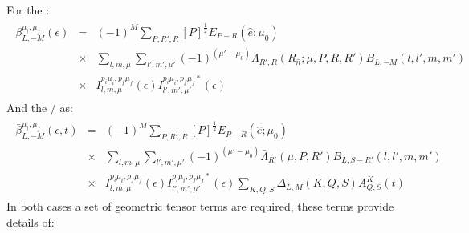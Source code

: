 \documentclass[letterpaper,table,10pt,english]{jupyterBook}
\begin{document}
\sphinxAtStartPar
For the {\hyperref[\detokenize{backmatter/glossary:term-MF}]{}}:
\begin{equation}\label{equation:part1/theory_tensor_formalism_160723:eq:BLM-tensor-MF}
\begin{split}\begin{aligned}
\beta_{L,-M}^{\mu_{i},\mu_{f}}(\epsilon) & = & (-1)^{M}\sum_{P,R',R}{[P]^{\frac{1}{2}}}{E_{P-R}(\hat{e};\mu_{0})}\\
 & \times &\sum_{l,m,\mu}\sum_{l',m',\mu'}(-1)^{(\mu'-\mu_{0})}{\Lambda_{R',R}(R_{\hat{n}};\mu,P,R,R')B_{L,-M}(l,l',m,m')}\\
 & \times & I_{l,m,\mu}^{p_{i}\mu_{i},p_{f}\mu_{f}}(\epsilon)I_{l',m',\mu'}^{p_{i}\mu_{i},p_{f}\mu_{f}*}(\epsilon)\end{aligned}\end{split}
\end{equation}
\sphinxAtStartPar
And the {\hyperref[\detokenize{backmatter/glossary:term-LF}]{}}/{\hyperref[\detokenize{backmatter/glossary:term-AF}]{}} as:
\begin{equation}\label{equation:part1/theory_tensor_formalism_160723:eq:BLM-tensor-AF}
\begin{split}\begin{aligned}
\bar{\beta}_{L,-M}^{\mu_{i},\mu_{f}}(\epsilon,t) & = & (-1)^{M}\sum_{P,R',R}{[P]^{\frac{1}{2}}}{E_{P-R}(\hat{e};\mu_{0})}\\
 & \times &\sum_{l,m,\mu}\sum_{l',m',\mu'}(-1)^{(\mu'-\mu_{0})}{\bar{\Lambda}_{R'}(\mu,P,R')B_{L,S-R'}(l,l',m,m')}\\
 & \times &I_{l,m,\mu}^{p_{i}\mu_{i},p_{f}\mu_{f}}(\epsilon)I_{l',m',\mu'}^{p_{i}\mu_{i},p_{f}\mu_{f}*}(\epsilon)\sum_{K,Q,S}\Delta_{L,M}(K,Q,S)A_{Q,S}^{K}(t)\end{aligned}\end{split}
\end{equation}
\sphinxAtStartPar
In both cases a set of geometric tensor terms are required, these terms provide details of:
\end{document}
